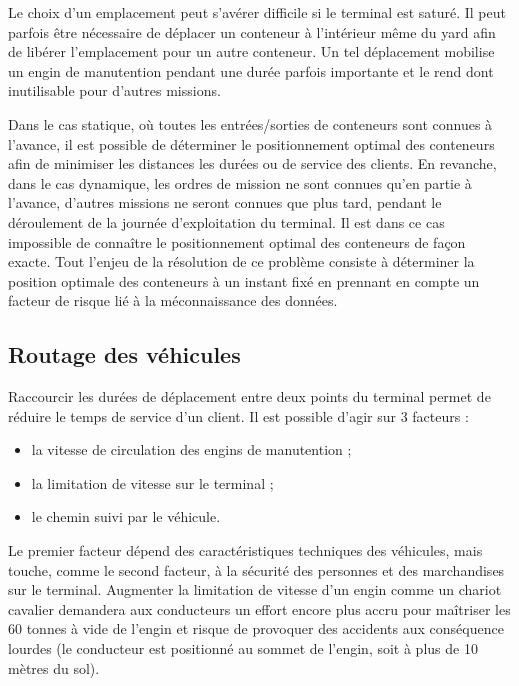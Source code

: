 Le choix d'un emplacement peut s'avérer difficile si le terminal est saturé. Il peut parfois être nécessaire de déplacer un conteneur à l'intérieur même du yard afin de libérer l'emplacement pour un autre conteneur. Un tel déplacement mobilise un engin de manutention pendant une durée parfois importante et le rend dont inutilisable pour d'autres missions.

Dans le cas statique, où toutes les entrées/sorties de conteneurs sont connues à l'avance, il est possible de déterminer le positionnement optimal des conteneurs afin de minimiser les distances les durées ou de service des clients. En revanche, dans le cas dynamique, les ordres de mission ne sont connues qu'en partie à l'avance, d'autres missions ne seront connues que plus tard, pendant le déroulement de la journée d'exploitation du terminal. Il est dans ce cas impossible de connaître le positionnement optimal des conteneurs de façon exacte. Tout l'enjeu de la résolution de ce problème consiste à déterminer la position optimale des conteneurs à un instant fixé en prennant en compte un facteur de risque lié à la méconnaissance des données.

\subsection{Routage des véhicules} \label{chap:contexte:opt:routageVehicules}

Raccourcir les durées de déplacement entre deux points du terminal permet de réduire le temps de service d'un client. Il est possible d'agir sur 3 facteurs : 
\begin{itemize}
 \item la vitesse de circulation des engins de manutention ;
 \item la limitation de vitesse sur le terminal ; 
 \item le chemin suivi par le véhicule.
\end{itemize}

Le premier facteur dépend des caractéristiques techniques des véhicules, mais touche, comme le second facteur, à la sécurité des personnes et des marchandises sur le terminal. Augmenter la limitation de vitesse d'un engin comme un chariot cavalier demandera aux conducteurs un effort encore plus accru pour maîtriser les 60 tonnes à vide de l'engin et risque de provoquer des accidents aux conséquence lourdes (le conducteur est positionné au sommet de l'engin, soit à plus de 10 mètres du sol).

